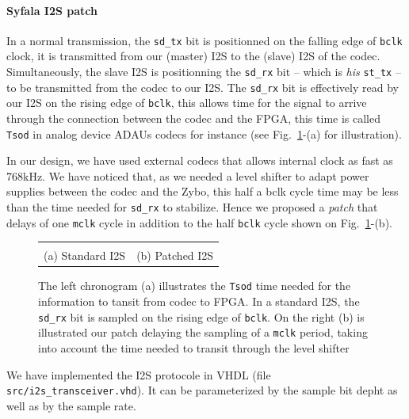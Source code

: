 \documentclass[11pt]{article}
\numberwithin{equation}{section}
\numberwithin{figure}{section}
\begin{document}
\paragraph{Syfala I2S patch} In a normal transmission, the {\tt sd\_tx} bit is positionned on the falling edge of {\tt bclk} clock, it is transmitted from our (master) I2S to the (slave) I2S of the codec. Simultaneously, the slave I2S is positionning the {\tt sd\_rx} bit -- which is {\em his} {\tt st\_tx} -- to be transmitted from the codec to our I2S. The {\tt sd\_rx} bit is effectively read by our I2S on the rising edge of {\tt bclk}, this allows time for the signal to arrive through the connection between the codec and the FPGA, this time is called {\tt Tsod} in analog device ADAUs codecs for instance (see Fig.~\ref{figi2szoom2}-(a) for illustration).  

In our design, we have used external codecs that allows internal clock as fast as 768kHz. We have noticed that, as we needed a level shifter to adapt power supplies between the codec and the Zybo, this  half a bclk cycle time may be less than the time needed for {\tt sd\_rx} to stabilize. Hence we proposed a {\em patch} that delays of one  {\tt mclk} cycle in addition to the half {\tt bclk} cycle shown on Fig.~\ref{figi2szoom2}-(b).

\begin{figure}[ht]
  \begin{tabular}{cc}
    \begin{boxedminipage}{0.5\textwidth}
      
      \end{boxedminipage} &
    \begin{boxedminipage}{0.5\textwidth}
      
            \end{boxedminipage}\\
  (a) Standard I2S & (b) Patched I2S \\
  \end{tabular}
  \caption{The left chronogram (a) illustrates the {\tt Tsod} time needed for the information to tansit from codec to FPGA. In a standard I2S, the {\tt sd\_rx} bit is sampled on the rising edge of {\tt bclk}. On the right (b) is illustrated our patch delaying the sampling of a {\tt mclk} period, taking into account the time needed to transit through the level shifter}
  \label{figi2szoom2}
\end{figure}

We have implemented the I2S protocole in VHDL (file {\tt src/i2s\_transceiver.vhd}). It can be parameterized by the  sample bit depht as well as by the sample rate.  
\end{document}
